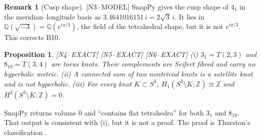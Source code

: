 \documentclass[11pt]{article}
\newtheorem{proposition}[theorem]{Proposition}
\theoremstyle{definition}
\newtheorem{remark}[theorem]{Remark}
\newcommand{\dtag}[1]{#1}
\begin{document}
\begin{remark}[Cusp shape]\dtag{\textsf{\small[N3\,$\cdot$\,MODEL]}}
SnapPy gives the cusp shape of $4_1$ in the meridian--longitude basis as $3.4641016151\,i=2\sqrt3\,i$. It lies in $\mathbb Q(\sqrt{-3})=\mathbb Q(e^{i\pi/3})$, the field of the tetrahedral shape, but it is not $e^{i\pi/3}$. This corrects B10.
\end{remark}

\begin{proposition}\dtag{\textsf{\small[N4\,$\cdot$\,EXACT]} \textsf{\small[N5\,$\cdot$\,EXACT]} \textsf{\small[N6\,$\cdot$\,EXACT]}}
(i) $3_1=T(2,3)$ and $8_{19}=T(3,4)$ are torus knots. Their complements are Seifert fibred and carry no hyperbolic metric. (ii) A connected sum of two nontrivial knots is a satellite knot and is not hyperbolic. (iii) For every knot $K\subset S^3$, $H_1(S^3\setminus K;\mathbb Z)\cong\mathbb Z$ and $H^2(S^3\setminus K;\mathbb Z)=0$.
\end{proposition}
SnapPy returns volume $0$ and ``contains flat tetrahedra'' for both $3_1$ and $8_{19}$. That output is consistent with (i), but it is not a proof. The proof is Thurston's classification \cite{Thurston82}.
\end{document}
